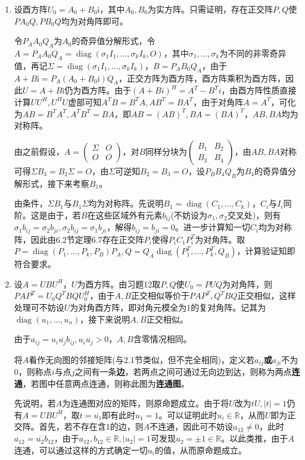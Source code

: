 \documentclass[a4paper,UTF8,fontset=windows]{ctexart}
\DeclareMathOperator{\diag}{diag}
\begin{document}
\begin{enumerate}
\item
设酉方阵$U_0=A_0+B_0\mathrm{i}$，其中$A_0,B_0$为实方阵。只需证明，存在正交阵$P,Q$使$PA_0Q,PB_0Q$均为对角阵即可。

令$P_AA_0Q_A$为$A_0$的奇异值分解形式，令$A=P_AA_0Q_A=\diag(\sigma_1I_1,\dots,\sigma_kI_k,O)$，其中$\sigma_1,\dots,\sigma_k$为不同的非零奇异值，再记$\Sigma=\diag(\sigma_1I_1,\dots,\sigma_kI_k)$，$B=P_AB_0Q_A$，由于$A+B\mathrm{i}=P_A(A_0+B_0\mathrm{i})Q_A$，正交方阵为酉方阵，酉方阵乘积为酉方阵，因此$U=A+B\mathrm{i}$仍为酉方阵。由于$(A+Bi)^H=A^T-B^Ti$，由酉方阵性质直接计算$UU^H,U^HU$虚部可知$A^TB=B^TA,AB^T=BA^T$，由于对角阵$A=A^T$，可化为$AB=B^TA^T,A^TB^T=BA$，即$AB=(AB)^T,BA=(BA)^T$，$AB,BA$均为对称阵。

由之前假设，$A=\begin{pmatrix}\Sigma&O\\O&O\end{pmatrix}$，对$B$同样分块为$\begin{pmatrix}B_1&B_2\\B_3&B_4\end{pmatrix}$，由$AB,BA$对称可得$\Sigma B_3=B_2\Sigma=O$，由$\Sigma$可逆知$B_2=B_3=O$，设$P_BB_4Q_B$为$B_4$的奇异值分解形式，接下来考察$B_1$。

由条件，$\Sigma B_1$与$B_1\Sigma$均为对称阵。先说明$B_1=\diag(C_1,\dots,C_k)$，$C_i$与$I_i$同阶。这是由于，若$B$在这些区域外有元素$b_{ij}$(不妨设为$\sigma_1,\sigma_2$交叉处)，则有$\sigma_1b_{ij}=\sigma_2b_{ji},\sigma_2b_{ij}=\sigma_1b_{ji}$，解得$b_{ij}=b_{ji}=0$。进一步计算知一切$C_i$均为对称阵，因此由6.2节定理6.7存在正交阵$P_i$使得$P_iC_1P_i^T$为对角阵。取$P=\diag(P_1,\dots,P_k,P_B)P_A,Q=Q_A\diag(P_1^T,\dots,P_k^T,Q_B)$，计算验证知即符合要求。

\item
设$A=UBU^H$，$U$为酉方阵。由习题12取$P,Q$使$U_0=PUQ$为对角阵，则$PAP^T=U_0Q^TBQU_0^H$，由于$A,B$正交相似等价于$PAP^T,Q^TBQ$正交相似，这样处理可不妨设$U$为对角酉方阵，即对角元模全为1的复对角阵。记其为$\diag(u_1,\dots,u_n)$，接下来说明$A,B$正交相似。

由于$a_{ij}=u_i\overline{u_j}b_{ij},u_i\overline{u_j}>0$，$A,B$含零情况相同。

将$A$看作无向图的邻接矩阵(与2.1节类似，但不完全相同)，定义若$a_{ij}$\textbf{或}$a_{ji}$不为0，则称点$i$与点$j$之间有一条\textbf{边}，若两点之间可通过无向边到达，则称为两点\textbf{连通}，若图中任意两点连通，则称此图为\textbf{连通图}。

先说明，若$A$为连通图对应的矩阵，则原命题成立。由于将$U$改为$tU,|t|=1$仍有$A=UBU^H$，取$t=\overline{u_1}$即有此时$u_1=1$。可以证明此时$u_i\in\mathbb{R}$，从而$U$即为正交阵。首先，若不存在含1的边，则$A$不连通，因此可不妨设$a_{12}\ne0$，此时$a_{12}=\overline{u_2}b_{12}$，由于$a_{12},b_{12}\in\mathbb{R},|u_2|=1$可发现$u_2=\pm1\in\mathbb{R}$。以此类推，由于$A$连通，可以通过这样的方式确定一切$u_i$的值，从而原命题成立。


\end{enumerate}
\end{document}
